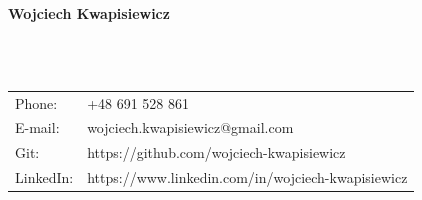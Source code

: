 \documentclass[twoside,a4paper,10pt]{article}
\begin{document}
\begin{LARGE} 
	\textbf{Wojciech Kwapisiewicz}
\end{LARGE}\\
\\
\begin{tabular}{p{}|p{}}
	Phone: & +48 691 528 861                  \\
	E-mail:     & wojciech.kwapisiewicz@gmail.com\\
	Git:    & https://github.com/wojciech-kwapisiewicz \\
	LinkedIn: & https://www.linkedin.com/in/wojciech-kwapisiewicz
\end{tabular}\\
\\
\\

\\
\\

\\
\\

\\
\\

\\
\\

\end{document}
